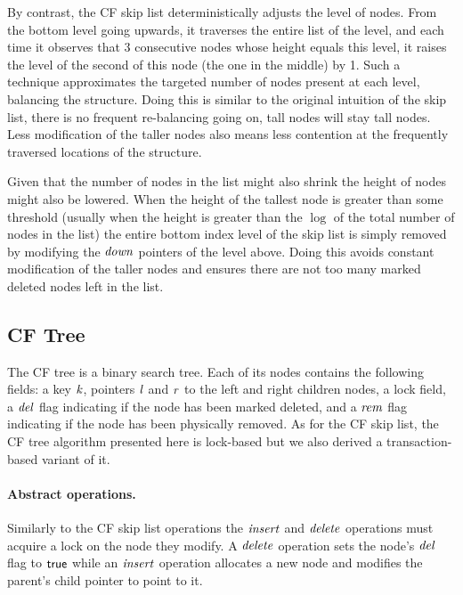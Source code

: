 By contrast, the CF skip list deterministically adjusts the level of nodes.
From the bottom level going upwards, it traverses the entire list of the level, 
and each time it observes that 3 consecutive nodes whose height equals this level,
it raises the level of the second of this node (the one in the middle) by 1.
Such a technique approximates the targeted number of nodes present at each level, 
balancing the structure.
Doing this is similar to the original intuition of the skip list, there is no
frequent re-balancing going on, tall nodes will stay tall nodes.
Less modification of the taller nodes also means less contention
at the frequently traversed locations of the structure.

Given that the number of nodes in the list might also shrink
the height of nodes might also be lowered.
When the height of the tallest node is greater than some threshold
(usually when the height is greater than the $\log$ of the total number of
nodes in the list) the entire bottom index level of the skip list is simply removed
by modifying the $\ms{down}$ pointers of the level above.
Doing this avoids constant modification of the taller nodes and ensures
there are not too many marked deleted nodes left in the list.

\subsection{CF Tree}

The CF tree is a binary search tree. Each of its nodes contains the following fields: a key $\ms{k}$, pointers $\ms{l}$ and $\ms{r}$ to the left and right children nodes, a lock field, a $\ms{del}$ flag indicating if the node has
been marked deleted, and a $\ms{rem}$ flag indicating if the node has been physically removed.
As for the CF skip list, the CF tree algorithm presented here is lock-based but we also derived 
a transaction-based variant of it.

\paragraph{Abstract operations.}
Similarly to the CF skip list operations the 
$\ms{insert}$ and $\ms{delete}$ operations must acquire a lock on the node
they modify.
A $\ms{delete}$ operation sets the node's $\ms{del}$ flag to $\lit{true}$ while an $\ms{insert}$ operation allocates a new node and modifies the parent's child pointer to point to it.

